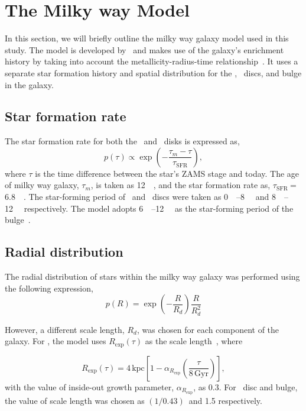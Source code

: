 \section{The Milky way Model}
\label{sec:milky_way}
In this section, we will briefly outline the milky way galaxy model used in this study.
The model is developed by~\cite{wagg2021gravitational} and makes use of the galaxy's enrichment history by taking
into account the metallicity-radius-time relationship~\cite{Frankel2018}.
It uses a separate star formation history and spatial distribution for the \lowalpha, \highalpha\ discs, and bulge in the galaxy.

\subsection{Star formation rate}
\label{subsec:star_formation_rate}
The star formation rate for both the \lowalpha\ and \highalpha\ disks is expressed as,
\begin{equation}
    p(\tau) \propto \exp\left(-\frac{\tau_m - \tau}{\tau_\text{SFR}}\right),
    \label{eq:star_formation_rate_equation}
\end{equation}
where $\tau$ is the time difference between the star's ZAMS stage and today.
The age of milky way galaxy, $\tau_m$, is taken as \SI{12}{\giga\yr}, and the star formation rate as, $\tau_\text{
    SFR}\ $= \SI{6.8}{\giga\yr}.
The star-forming period of \lowalpha\ and \highalpha\ discs were taken as \SIrange{0}{8}{\giga\yr} and \SIrange{8}{12}{\giga\yr} respectively.
The model adopts \SIrange{6}{12}{\giga\yr} as the star-forming period of the bulge~\cite{Bovy2019}.

\subsection{Radial distribution}
\label{subsec:radial_distribution}
The radial distribution of stars within the milky way galaxy was performed using the following expression,
\begin{equation}%
    p(R) = \exp\left(-\frac{R}{R_d}\right)\frac{R}{R_d^2}
    \label{eq:radial_distribution_of_stars}
\end{equation}%

However, a different scale length, $R_d$, was chosen for each component of the galaxy.
For \lowalpha, the model uses $R_\text{exp}(\tau)$ as the scale length~\cite[Eq 6]{Frankel2018}, where

\begin{equation}%
    R_\text{exp}(\tau) = 4\,\text{kpc}\left[1 - \alpha_{R_\text{exp}}\left(\frac{\tau}{8\,\text{Gyr}}\right)\right],
    \label{eq:exponential_radius_equation}
\end{equation}%
with the value of inside-out growth parameter, $\alpha_{R_\text{exp}}$, as 0.3. For \highalpha\ disc and bulge, the value of scale length was chosen as $(1/0.43)\,$\si{\kpc} and \SI{1.5}{\kpc} respectively.

